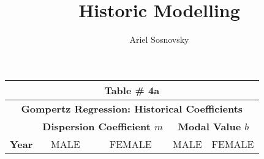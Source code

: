 \documentclass[10pt, titlepage]{article}%
\author{Ariel Sosnovsky}
\begin{document}
\title{Historic Modelling}
\maketitle

\clearpage

\begin{table}
  \begin{tabular}{||l|c|c|c|c||}
  \hline\hline
  \multicolumn{5}{||c||}{Table \# 4a } \\ \hline\hline
  \multicolumn{5}{||c||}{{\bf Gompertz Regression: Historical Coefficients}} \\ \hline\hline
  
  { } & 
  \multicolumn{2}{|c|}{ \bf Dispersion Coefficient $m$ } & 
  \multicolumn{2}{|c|}{ \bf Modal Value $b$ }\\ \hline\hline
  
  {\bf Year } &
  {MALE} & {FEMALE} &
  {MALE} & {FEMALE} \\ \hline\hline


\end{tabular}
\end{table}
\end{document}
